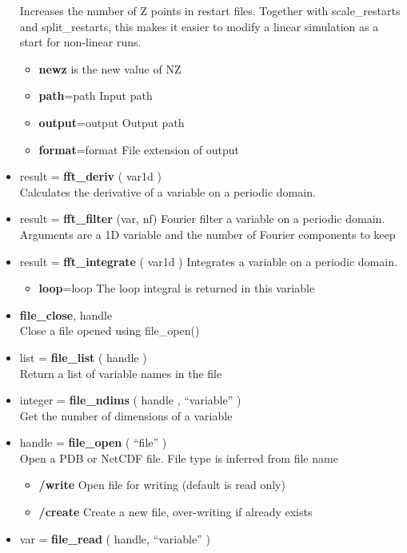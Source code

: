 \documentclass[12pt]{article}
\begin{document}
\begin{itemize}
  Increases the number of Z points in restart files. Together with
  scale\_restarts and split\_restarts, this makes it easier to modify a linear
  simulation as a start for non-linear runs.
  \begin{itemize}
  \item {\bf newz} is the new value of NZ
  \item {\bf path}=path      Input path
  \item {\bf output}=output  Output path
  \item {\bf format}=format  File extension of output
  \end{itemize}
%
\item result = {\bf fft\_deriv} ( var1d ) \\
  Calculates the derivative of a variable on a periodic domain.
\item result = {\bf fft\_filter} (var, nf)
  Fourier filter a variable on a periodic domain. Arguments are a 1D variable
  and the number of Fourier components to keep
\item result = {\bf fft\_integrate} ( var1d )
  Integrates a variable on a periodic domain.
  \begin{itemize}
  \item {\bf loop}=loop  The loop integral is returned in this variable
  \end{itemize}
%
\item {\bf file\_close}, handle \\
  Close a file opened using file\_open()
\item list = {\bf file\_list} ( handle ) \\
  Return a list of variable names in the file
\item integer = {\bf file\_ndims} ( handle , ``variable'' ) \\
  Get the number of dimensions of a variable
\item handle = {\bf file\_open} ( ``file'' ) \\
  Open a PDB or NetCDF file. File type is inferred from file name
  \begin{itemize}
    \item {\bf /write}  Open file for writing (default is read only)
    \item {\bf /create} Create a new file, over-writing if already exists
  \end{itemize}
%
\item var = {\bf file\_read} ( handle, ``variable'' )
  \begin{itemize}

\end{itemize}
\end{itemize}
\end{document}
